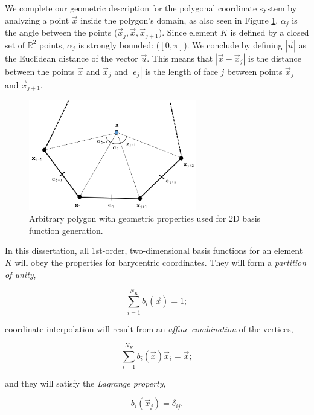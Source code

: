 We complete our geometric description for the polygonal coordinate system by analyzing a point $\vec{x}$ inside the polygon's domain, as also seen in Figure \ref{fig::BF_2D_ref_polygon}. $\alpha_j$ is the angle between the points ($\vec{x}_j, \vec{x}, \vec{x}_{j+1}$). Since element $K$ is defined by a closed set of $\mathbb{R}^2$ points, $\alpha_j$ is strongly bounded: ($[0, \pi]$). We conclude by defining $|\vec{u}|$ as the Euclidean distance of the vector $\vec{u}$. This means that $|\vec{x} - \vec{x}_j|$ is the distance between the points $\vec{x}$ and $\vec{x}_j$ and $|e_j|$ is the length of face $j$ between points $\vec{x}_j$ and $\vec{x}_{j+1}$.

\begin{figure}[hbt]
\centering
\includegraphics[width=0.65\textwidth]{figures/sec_BF/ref_polygon.png}
\caption{Arbitrary polygon with geometric properties used for 2D basis function generation.}
\label{fig::BF_2D_ref_polygon}
\end{figure}

In this dissertation, all 1st-order, two-dimensional basis functions for an element $K$ will obey the properties for barycentric coordinates. They will form a {\em partition of unity},

\begin{equation}
\sum_{i=1}^{N_K} b_i (\vec{x})  =  1;
\label{eq::BF_linear_interp_partition}
\end{equation}

\noindent coordinate interpolation will result from an {\em affine combination} of the vertices,

\begin{equation}
\sum_{i=1}^{N_K} b_i(\vec{x}) \vec{x}_i  =  \vec{x};
\label{eq::BF_linear_interp_affine}
\end{equation}

\noindent and they will satisfy the {\em Lagrange property},

\begin{equation}
b_i (\vec{x}_j) = \delta_{ij}.
\label{eq::BF_linear_interp_lagrange}
\end{equation}

